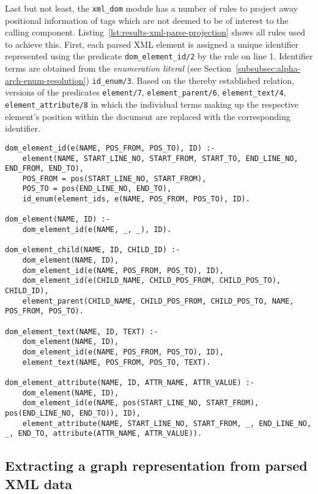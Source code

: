 Last but not least, the \texttt{xml\_dom} module has a number of rules to project away positional information of tags which are not deemed to be of interest to the calling component. Listing~\ref{lst:results-xml-parse-projection} shows all rules used to achieve this. First, each parsed XML element is assigned a unique identifier represented using the predicate \texttt{dom\_element\_id/2} by the rule on line 1. Identifier terms are obtained from the \emph{enumeration literal} (see Section~\ref{subsubsec:alpha-arch-enum-resolution}) \texttt{id\_enum/3}. Based on the thereby established relation, versions of the predicates \texttt{element/7}, \texttt{element\_parent/6}, \texttt{element\_text/4}, \texttt{element\_attribute/8} in which the individual terms making up the respective element's position within the document are replaced with the corresponding identifier.

\begin{lstlisting}[style=asp-code, label={lst:results-xml-parse-projection}, caption={Deriving simplified representations of parsed XML content.}]
dom_element_id(e(NAME, POS_FROM, POS_TO), ID) :- 
	element(NAME, START_LINE_NO, START_FROM, START_TO, END_LINE_NO, END_FROM, END_TO),
	POS_FROM = pos(START_LINE_NO, START_FROM),
	POS_TO = pos(END_LINE_NO, END_TO),
	id_enum(element_ids, e(NAME, POS_FROM, POS_TO), ID).

dom_element(NAME, ID) :-
	dom_element_id(e(NAME, _, _), ID).	

dom_element_child(NAME, ID, CHILD_ID) :-
	dom_element(NAME, ID),
	dom_element_id(e(NAME, POS_FROM, POS_TO), ID),	
	dom_element_id(e(CHILD_NAME, CHILD_POS_FROM, CHILD_POS_TO), CHILD_ID),
	element_parent(CHILD_NAME, CHILD_POS_FROM, CHILD_POS_TO, NAME, POS_FROM, POS_TO).

dom_element_text(NAME, ID, TEXT) :-
	dom_element(NAME, ID),
	dom_element_id(e(NAME, POS_FROM, POS_TO), ID),
	element_text(NAME, POS_FROM, POS_TO, TEXT).	

dom_element_attribute(NAME, ID, ATTR_NAME, ATTR_VALUE) :-
	dom_element(NAME, ID),
	dom_element_id(e(NAME, pos(START_LINE_NO, START_FROM), pos(END_LINE_NO, END_TO)), ID),
	element_attribute(NAME, START_LINE_NO, START_FROM, _, END_LINE_NO, _, END_TO, attribute(ATTR_NAME, ATTR_VALUE)).	
\end{lstlisting}    

\subsection{Extracting a graph representation from parsed XML data}
\label{subsec:results-xml-extract-graph}

